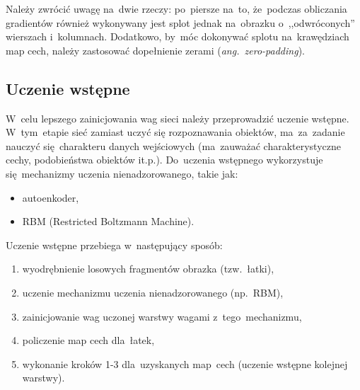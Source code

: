 Należy zwrócić uwagę na~dwie rzeczy: po~piersze na~to, że~podczas obliczania gradientów również wykonywany
jest splot jednak na~obrazku o~,,odwróconych'' wierszach i~kolumnach. Dodatkowo, by~móc dokonywać splotu
na~krawędziach map cech, należy zastosować dopełnienie zerami (\textit{ang.~zero-padding}).

\subsection{Uczenie wstępne}
W~celu lepszego zainicjowania wag sieci należy przeprowadzić uczenie wstępne. W~tym~etapie sieć zamiast uczyć
się rozpoznawania obiektów, ma~za~zadanie nauczyć się~charakteru danych wejściowych (ma~zauważać
charakterystyczne cechy, podobieństwa obiektów it.p.). Do~uczenia wstępnego wykorzystuje się~mechanizmy
uczenia nienadzorowanego, takie jak:
\begin{itemize}
  \item autoenkoder,
  \item RBM (Restricted Boltzmann Machine).
\end{itemize}

Uczenie wstępne przebiega w~następujący sposób:
\begin{enumerate}
  \item wyodrębnienie losowych fragmentów obrazka (tzw.~łatki),
  \item uczenie mechanizmu uczenia nienadzorowanego (np.~RBM),
  \item zainicjowanie wag uczonej warstwy wagami z~tego~mechanizmu,
  \item policzenie map cech dla~łatek,
  \item wykonanie kroków 1-3 dla~uzyskanych map~cech (uczenie wstępne kolejnej warstwy).
\end{enumerate}

